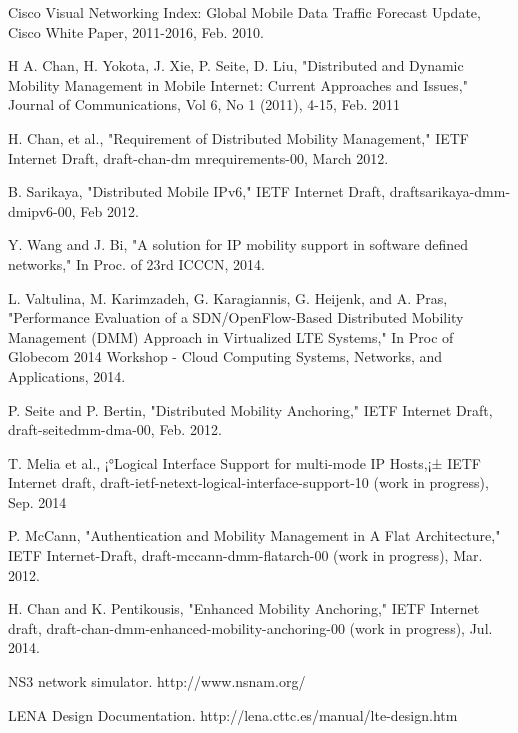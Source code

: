 \documentclass[runningheads,a4paper]{llncs}
\begin{document}
\begin{thebibliography}{4}

 Cisco Visual Networking Index: Global Mobile Data Traffic Forecast Update,  Cisco White Paper, 2011-2016, Feb. 2010.

 H A. Chan, H. Yokota, J. Xie, P. Seite, D. Liu, "Distributed and Dynamic Mobility Management in Mobile Internet: Current Approaches and Issues," Journal of Communications, Vol 6, No 1 (2011), 4-15, Feb. 2011

 H. Chan, et al., "Requirement of Distributed Mobility Management," IETF Internet Draft, draft-chan-dm mrequirements-00, March 2012.

 B. Sarikaya, "Distributed Mobile IPv6," IETF Internet Draft, draftsarikaya-dmm-dmipv6-00, Feb 2012.

 Y. Wang and J. Bi, "A solution for IP mobility support in software defined networks," In Proc. of 23rd ICCCN, 2014.

 L. Valtulina, M. Karimzadeh, G. Karagiannis, G. Heijenk, and A. Pras, "Performance Evaluation of a SDN/OpenFlow-Based Distributed Mobility Management (DMM) Approach in Virtualized LTE Systems," In Proc of Globecom 2014 Workshop - Cloud Computing Systems, Networks, and Applications, 2014.

 P. Seite and P. Bertin, "Distributed Mobility Anchoring," IETF Internet Draft, draft-seitedmm-dma-00, Feb. 2012.

 T. Melia et al., ¡°Logical Interface Support for multi-mode IP Hosts,¡± IETF Internet draft, draft-ietf-netext-logical-interface-support-10 (work in progress), Sep. 2014

 P. McCann, "Authentication and Mobility Management in A Flat Architecture," IETF Internet-Draft, draft-mccann-dmm-flatarch-00 (work in progress), Mar. 2012.

 H. Chan and K. Pentikousis, "Enhanced Mobility Anchoring," IETF Internet draft, draft-chan-dmm-enhanced-mobility-anchoring-00 (work in progress), Jul. 2014.

 NS3 network simulator. http://www.nsnam.org/

 LENA Design Documentation. http://lena.cttc.es/manual/lte-design.htm

\end{thebibliography}
\end{document}
